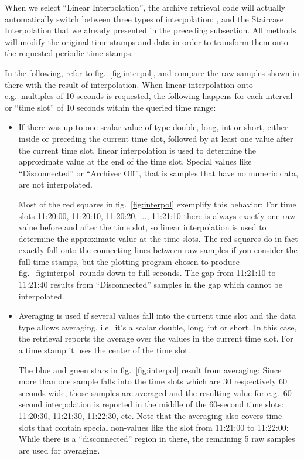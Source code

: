 \noindent When we select ``Linear Interpolation'', the archive retrieval code
will actually automatically switch between three types of
interpolation: ,  and the
Staircase Interpolation that we already presented in the preceding
subsection. All methods will modify the original time stamps and data
in order to transform them onto the requested periodic time stamps.  

In the following, refer to fig.~\ref{fig:interpol}, and compare the
raw samples shown in there with the result of interpolation.  When
linear interpolation onto e.g.\ multiples of 10 seconds is requested,
the following happens for each interval or ``time slot'' of 10 seconds
within the queried time range:
\begin{itemize}
\item If there was up to one scalar value of type double,
  long, int or short, either inside or preceding the current time
  slot, followed by at least one value after the current time slot,
  linear interpolation is used to determine the approximate value at
  the end of the time slot. Special values like ``Disconnected'' or
  ``Archiver Off'', that is samples that have no numeric data, are not
  interpolated.

  Most of the red squares in fig.~\ref{fig:interpol} exemplify this
  behavior: For time slots 11:20:00, 11:20:10, 11:20:20, ..., 11:21:10
  there is always exactly one raw value before and after the time
  slot, so linear interpolation is used to determine the approximate
  value at the time slots.
  The red squares do in fact exactly fall onto the connecting lines
  between raw samples if you consider the full time stamps, but the
  plotting program chosen to produce fig.~\ref{fig:interpol} rounds
  down to full seconds.
  The gap from 11:21:10 to 11:21:40 results from ``Disconnected''
  samples in the gap which cannot be interpolated.

\item Averaging is used if several values fall into the
  current time slot and the data type allows averaging,
  i.e.\ it's a scalar double, long, int or short.
  In this case, the retrieval reports the average over
  the values in the current time slot. For a time stamp
  it uses the center of the time slot.

  The blue and green stars in fig.~\ref{fig:interpol} result from
  averaging: Since more than one sample falls into the time slots
  which are 30 respectively 60 seconds wide, those samples are
  averaged and the resulting value for e.g.\ 60 second interpolation
  is reported in the middle of the 60-second time slots: 11:20:30, 11:21:30,
  11:22:30, etc. Note that the averaging also covers time slots that
  contain special non-values like the slot from 11:21:00 to 11:22:00:
  While there is a ``disconnected'' region in there, the remaining 5
  raw samples are used for averaging.


\end{itemize}
